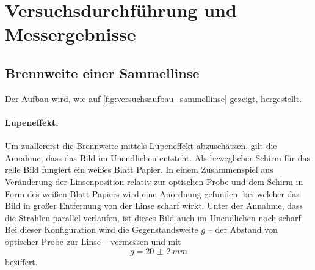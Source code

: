 \documentclass[ngerman]{scrartcl}
\begin{document}
\section{Versuchsdurchführung und Messergebnisse}
\label{sec:versuchsdurchfuehrung_messergebnisse}

\subsection{Brennweite einer Sammellinse}
\label{subsec:durchfuehrung_brennweite_sammellinse}

Der Aufbau wird, wie auf \autoref{fig:versuchsaufbau_sammellinse} gezeigt, hergestellt.


\paragraph{Lupeneffekt.}
Um zuallererst die Brennweite mittels Lupeneffekt abzuschätzen, gilt die Annahme, dass das Bild im Unendlichen entsteht. Als beweglicher Schirm für das relle Bild fungiert ein weißes Blatt Papier. In einem Zusammenspiel aus Veränderung der Linsenposition relativ zur optischen Probe und dem Schirm in Form des weißen Blatt Papiers wird eine Anordnung gefunden, bei welcher das Bild in großer Entfernung von der Linse scharf wirkt. Unter der Annahme, dass die Strahlen parallel verlaufen, ist dieses Bild auch im Unendlichen noch scharf. Bei dieser Konfiguration wird die Gegenstandsweite $g$ -- der Abstand von optischer Probe zur Linse -- vermessen und mit
\[g=\SI{20(2)}{mm}\]
beziffert.
\end{document}
